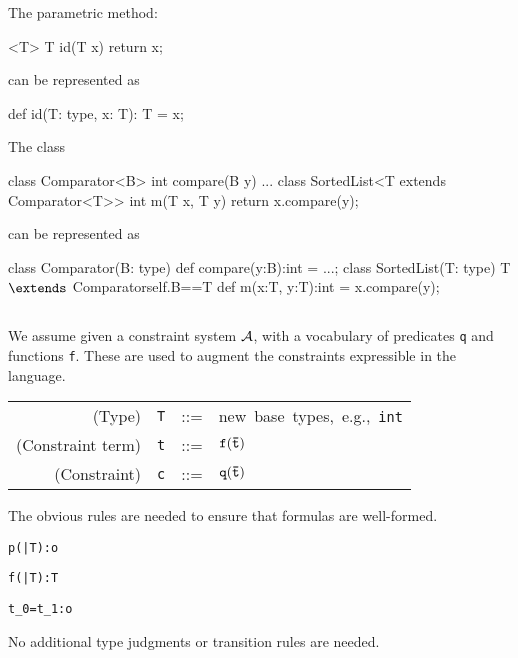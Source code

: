 \begin{example}
The \FGJ{} parametric method:

\begin{xten} 
<T> T id(T x) { return x; }
\end{xten}
\noindent can be represented as
\begin{xten} 
def id(T: type, x: T): T = x;
\end{xten}
\end{example}

\begin{example}
\noindent The \FGJ{} class 
\begin{xten} 
class Comparator<B> {
  int compare(B y) { ... } }
class SortedList<T extends Comparator<T>> { 
  int m(T x, T y) {
     return x.compare(y); } }
\end{xten}
\noindent can be represented as
\begin{xtenmath} 
class Comparator(B: type) {
  def compare(y:B):int = ...;
}
class SortedList(T: type)
    {T $\extends$ Comparator{self.B==T}} { 
  def m(x:T, y:T):int = x.compare(y);
}
\end{xtenmath}
\end{example}

\subsection{\FXD}
We assume given a constraint system $\cal A$, with a vocabulary of
predicates {\tt q} and functions {\tt f}. These are used to 
augment the constraints expressible in the language. 

\begin{tabular}{r@{\quad}rcl}
  (Type) & {\tt T} & {::=}& \mbox{new base types, e.g., {\tt int}}\\
  (Constraint term) & {\tt t} &{::=}& $\tt f(\bar{\tt t})$ \\
  (Constraint) & {\tt c} &{::=}& ${\tt q(\bar{\tt t})}$ 
\end{tabular}

\noindent
The obvious rules are needed to ensure that formulas are well-formed.

{
	{\Gamma \vdash \tt p(\bar{\tt T}):o}

	{\Gamma\tt \vdash \tt f(\bar{\tt T}):T}

	{\Gamma\tt \vdash t_0=t_1:o}
}
\noindent
No additional type judgments or transition rules are needed. 

